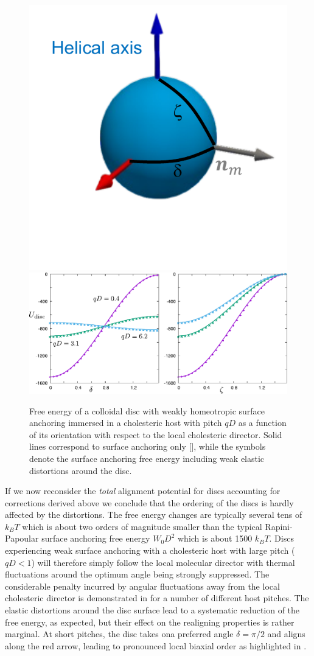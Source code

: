 \begin{figure}
\includegraphics[width = 0.25 \columnwidth]{figures/chapter-3/deldisc}
	\includegraphics[width = 0.7 \columnwidth]{figures/chapter-3/udisc}
	\caption[Free energy of a colloidal disc with weakly homeotropic surface anchoring immersed in a cholesteric host]{Free energy of a colloidal disc with weakly homeotropic surface anchoring immersed in a cholesteric host with pitch $qD$ as a function of its orientation with respect to the local cholesteric director.  Solid lines correspond to surface anchoring only  [], while the symbols denote the surface anchoring free energy including weak elastic distortions around the disc.  }
	\label{udisc}
\end{figure}

 If we now reconsider the {\em total} alignment potential for discs accounting for corrections derived above we conclude that the ordering of the discs is hardly affected by the distortions. The free energy changes are typically several tens of $k_{B}T$ which is about two orders of magnitude smaller than the typical Rapini-Papoular surface anchoring free energy $ W_{0} D^{2} $ which is about 1500 $k_{B}T$. Discs experiencing weak surface anchoring with  a cholesteric host with large pitch ($qD <1$)  will therefore simply follow the local molecular director with thermal fluctuations around the optimum angle being strongly suppressed. The considerable penalty incurred  by angular fluctuations away from the local cholesteric director is demonstrated in  for a number of different host pitches. The elastic distortions around the disc surface lead to a systematic reduction of the free energy, as expected, but their effect on the realigning properties is rather marginal. At short pitches, the disc takes ona preferred angle $\delta = \pi/2$ and aligns along the red arrow, leading to pronounced local biaxial order as highlighted in . 


